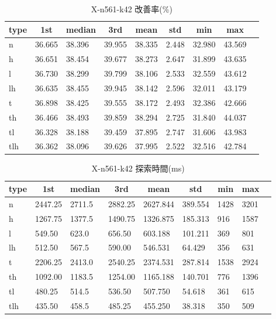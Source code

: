 \begin{table}[htbp]
    \centering
    \caption{X-n561-k42 改善率(\%)}
    \begin{tabular}{|l|l|l|l|l|l|l|l|l|}\hline
    \multicolumn{1}{|c|}{\textbf{type}}
    &\multicolumn{1}{|c|}{\textbf{1st}}
    &\multicolumn{1}{c|}{\textbf{median}}
    &\multicolumn{1}{c|}{\textbf{3rd}}
    &\multicolumn{1}{c|}{\textbf{mean}}
    &\multicolumn{1}{c|}{\textbf{std}}
    &\multicolumn{1}{c|}{\textbf{min}}
    &\multicolumn{1}{c|}{\textbf{max}}\\\hline
	n & 36.665 & 38.396 & 39.955 & 38.335 & 2.448 & 32.980 & 43.569\\\hline
	h & 36.651 & 38.454 & 39.677 & 38.273 & 2.647 & 31.899 & 43.635\\\hline
	l & 36.730 & 38.299 & 39.799 & 38.106 & 2.533 & 32.559 & 43.612\\\hline
	lh & 36.635 & 38.455 & 39.945 & 38.142 & 2.596 & 32.011 & 43.179\\\hline
	t & 36.898 & 38.425 & 39.555 & 38.172 & 2.493 & 32.386 & 42.666\\\hline
	th & 36.466 & 38.493 & 39.859 & 38.294 & 2.725 & 31.840 & 44.037\\\hline
	tl & 36.328 & 38.188 & 39.459 & 37.895 & 2.747 & 31.606 & 43.983\\\hline
	tlh & 36.362 & 38.096 & 39.626 & 37.995 & 2.522 & 32.516 & 42.784\\\hline
	\end{tabular}
\end{table}
\begin{table}[htbp]
    \centering
    \caption{X-n561-k42 探索時間(ms)}
    \begin{tabular}{|l|l|l|l|l|l|l|l|l|}\hline
    \multicolumn{1}{|c|}{\textbf{type}}
    &\multicolumn{1}{|c|}{\textbf{1st}}
    &\multicolumn{1}{c|}{\textbf{median}}
    &\multicolumn{1}{c|}{\textbf{3rd}}
    &\multicolumn{1}{c|}{\textbf{mean}}
    &\multicolumn{1}{c|}{\textbf{std}}
    &\multicolumn{1}{c|}{\textbf{min}}
    &\multicolumn{1}{c|}{\textbf{max}}\\\hline
	n & 2447.25 & 2711.5 & 2882.25 & 2627.844 & 389.554 & 1428 & 3201\\\hline
	h & 1267.75 & 1377.5 & 1490.75 & 1326.875 & 185.313 & 916 & 1587\\\hline
	l & 549.50 & 623.0 & 656.50 & 603.188 & 101.211 & 369 & 801\\\hline
	lh & 512.50 & 567.5 & 590.00 & 546.531 & 64.429 & 356 & 631\\\hline
	t & 2206.25 & 2413.0 & 2540.25 & 2374.531 & 287.814 & 1538 & 2924\\\hline
	th & 1092.00 & 1183.5 & 1254.00 & 1165.188 & 140.701 & 776 & 1396\\\hline
	tl & 480.25 & 514.5 & 536.50 & 507.750 & 54.618 & 361 & 615\\\hline
	tlh & 435.50 & 458.5 & 485.25 & 455.250 & 38.318 & 350 & 509\\\hline
	\end{tabular}
\end{table}
